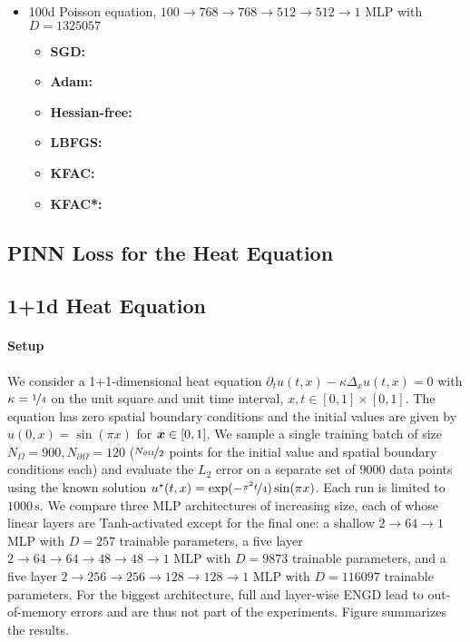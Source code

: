 \begin{itemize}
\item 100d Poisson equation, $100 \to 768 \to 768 \to 512 \to 512 \to 1$ MLP with $D=\num{1325057}$
  \begin{itemize}
    \def\pathToRuns{../kfac_pinns_exp/exp14_poisson_100d_weinan/tex}
  \item \textbf{SGD:} 
  \item \textbf{Adam:} 
  \item \textbf{Hessian-free:} 
  \item \textbf{LBFGS:} 
  \item \textbf{KFAC:} 
  \item \textbf{KFAC*:} 
  \end{itemize}
\end{itemize}

\subsection{PINN Loss for the Heat Equation}


\subsection{1+1d Heat Equation}

\paragraph{Setup} We consider a 1+1-dimensional heat equation $\partial_tu(t,x) - \kappa \Delta_{x} u(t, x) = 0$ with $\kappa = \nicefrac{1}{4}$ on the unit square and unit time interval, $x, t \in [0,1] \times [0,1]$.
The equation has zero spatial boundary conditions and the initial values are given by $u(0, x) = \sin(\pi x)$ for ${\bm{x}} \in [0,1]$.
We sample a single training batch of size $N_{\Omega} = \num{900}, N_{\partial\Omega} = 120$ ($\nicefrac{N_{\partial\Omega}}{2}$ points for the initial value and spatial boundary conditions each) and evaluate the $L_2$ error on a separate set of $\num{9000}$ data points using the known solution $u^{\star}(t, x) = \exp(-\nicefrac{\pi^2t}{4}) \sin(\pi x)$.
Each run is limited to $\num{1000}\,\text{s}$. We compare three MLP architectures of increasing size, each of whose linear layers are Tanh-activated except for the final one: a shallow $2\to 64\to 1$ MLP with $D=257$ trainable parameters, a five layer $2 \to 64 \to 64 \to 48 \to 48 \to 1$ MLP with $D=\num{9873}$ trainable parameters, and a five layer $2 \to 256 \to 256\to 128 \to 128 \to 1$ MLP with $D=\num{116097}$ trainable parameters.
For the biggest architecture, full and layer-wise ENGD lead to out-of-memory errors and are thus not part of the experiments.
Figure  summarizes the results.

